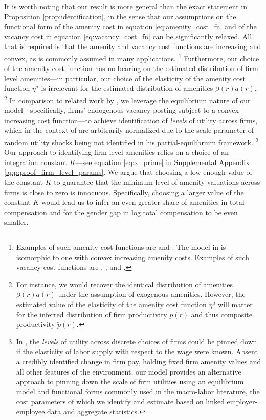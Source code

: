 It is worth noting that our result is more general than the exact statement in Proposition \ref{prop:identification}, in the sense that our assumptions on the functional form of the amenity cost in equation \eqref{eq:amenity_cost_fn} and of the vacancy cost in equation \eqref{eq:vacancy_cost_fn} can be significantly relaxed. All that is required is that the amenity and vacancy cost functions are increasing and convex, as is commonly assumed in many applications.%
%
\footnote{Examples of such amenity cost functions are \citet{HwangMortensenReed1998} and \citet{LangMajumdar2004}. The model in \citet{Sorkin2018} is isomorphic to one with convex increasing amenity costs. Examples of such vacancy cost functions are \citet{Mortensen2003}, \citet{BilalEngbomMongeyViolante2022}, and \citet{EngbomMoser2022a}.} %
%
Furthermore, our choice of the amenity cost function has no bearing on the estimated distribution of firm-level amenities---in particular, our choice of the elasticity of the amenity cost function $\eta^{a}$ is irrelevant for the estimated distribution of amenities $\beta(r) a(r)$.%
%
\footnote{For instance, we would recover the identical distribution of amenities $\beta(r) a(r)$ under the assumption of exogenous amenities. However, the estimated value of the elasticity of the amenity cost function $\eta^{a}$ will matter for the inferred distribution of firm productivity $p(r)$ and thus composite productivity $\tilde{p}(r)$.} %
%
In comparison to related work by \citet{Sorkin2017, Sorkin2018}, we leverage the equilibrium nature of our model---specifically, firms' endogenous vacancy posting subject to a convex increasing cost function---to achieve identification of \emph{levels} of utility across firms, which in the context of \citet{Sorkin2017, Sorkin2018} are arbitrarily normalized due to the scale parameter of random utility shocks being not identified in his partial-equilibrium framework.%
%
\footnote{In \citet{Sorkin2017, Sorkin2018}, the \emph{levels} of utility across discrete choices of firms could be pinned down if the elasticity of labor supply with respect to the wage were known. Absent a credibly identified change in firm pay, holding fixed firm amenity values and all other features of the environment, our model provides an alternative approach to pinning down the scale of firm utilities using an equilibrium model and functional forms commonly used in the macro-labor literature, the cost parameters of which we identify and estimate based on linked employer-employee data and aggregate statistics.} %
%
Our approach to identifying firm-level amenities relies on a choice of an integration constant $K$---see equation \eqref{eq:x_prime} in Supplemental Appendix \ref{app:proof_firm_level_params}. We argue that choosing a low enough value of the constant $K$ to guarantee that the minimum level of amenity valuations across firms is close to zero is innocuous. Specifically, choosing a larger value of the constant $K$ would lead us to infer an even greater share of amenities in total compensation and for the gender gap in log total compensation to be even smaller.


